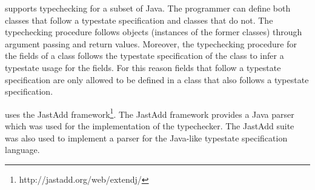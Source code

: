 \Mungo supports typechecking for a subset of Java.
The programmer can define both classes that follow
a typestate specification and classes that do not.
The typechecking procedure follows objects (instances
of the former classes) through argument passing and
return values. Moreover, the typechecking procedure
for the fields of a class follows the typestate
specification of the class to infer a typestate
usage for the fields. For this reason fields that
follow a typestate specification are only allowed to be defined
in a class that also follows a typestate specification.

\Mungo uses the JastAdd framework\footnote{http://jastadd.org/web/extendj/}\cite{jastadd}. The JastAdd framework provides a Java parser
which was used for the implementation of the \Mungo typechecker. The JastAdd suite was also used to implement a parser
for the Java-like typestate specification language.

%
%

%
%
